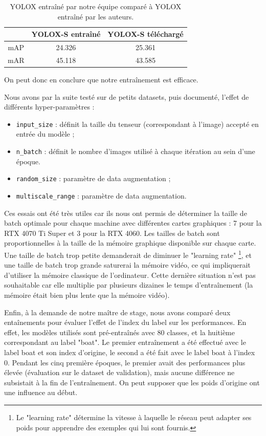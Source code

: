 \begin{table}[!h]
    \caption{YOLOX entraîné par notre équipe comparé à YOLOX entraîné par les auteurs.}
\begin{center}
    \begin{tabular}{ c c c }
        \hline
        & YOLOX-S entraîné & YOLOX-S téléchargé \\ 
        \hline
        mAP & 24.326 & 25.361 \\  
        mAR & 45.118 & 43.585   
    \end{tabular}
\end{center}
\end{table}

On peut donc en conclure que notre entraînement est efficace. 

Nous avons par la suite testé sur de petits datasets, puis documenté, 
l'effet de différents hyper-paramètres : 

\begin{itemize}
    \item \texttt{input\_size} : définit la taille du tenseur (correspondant à l'image) accepté en entrée du modèle ;
    \item \texttt{n\_batch} : définit le nombre d'images utilisé à chaque itération au sein d'une époque.
    \item \texttt{random\_size} : paramètre de data augmentation ; 
    \item \texttt{multiscale\_range} : paramètre de data augmentation.
\end{itemize}

Ces essais ont été très utiles car ils nous ont permis de déterminer la taille de batch 
optimale \cite{Goodfellow-et-al-2016} pour chaque machine avec différentes cartes graphiques : 
7 pour la RTX 4070 Ti Super et 3 pour la RTX 4060. 
Les tailles de batch sont proportionnelles à la taille de la mémoire graphique 
disponible sur chaque carte. Une taille de batch trop petite demanderait de diminuer le "learning rate"
\footnote{Le "learning rate" détermine la vitesse à laquelle le réseau peut adapter ses poids 
pour apprendre des exemples qui lui sont fournis.}, et une taille de batch trop grande 
saturerai la mémoire vidéo, ce qui impliquerait d'utiliser la mémoire classique de l'ordinateur. 
Cette dernière situation n'est pas souhaitable car elle multiplie par plusieurs dizaines 
le temps d'entraînement (la mémoire était bien plus lente que la mémoire vidéo). 

Enfin, à la demande de notre maître de stage, nous avons comparé deux entaînements pour évaluer 
l'effet de l'index du label sur les performances. 
En effet, les modèles utilisés sont pré-entraînés avec 80 classes, et la huitième correspondant 
au label "boat". Le premier entraînement a été effectué avec le label boat et son index d'origine,
le second a été fait avec le label boat à l'index 0. 
Pendant les cinq première époques, le premier avait des performances plus élevée (évaluation sur 
le dataset de validation), mais aucune différence ne subsistait à la fin de l'entraînement. 
On peut supposer que les poids d'origine ont une influence au début. 

